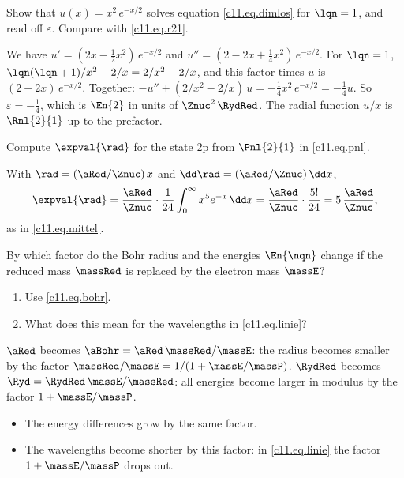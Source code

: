 \begin{exercise}\label{c11.exc.zweip}
  Show that $u(x) = x^2\,e^{-x/2}$ solves equation \eqref{c11.eq.dimlos} for $\lqn = 1$,
  and read off $\varepsilon$. Compare with \eqref{c11.eq.r21}.
\end{exercise}
\begin{solution}
  We have $u' = (2x - \tfrac12 x^2)\,e^{-x/2}$ and
  $u'' = (2 - 2x + \tfrac14 x^2)\,e^{-x/2}$. For $\lqn = 1$,
  $\lqn(\lqn + 1)/x^2 - 2/x = 2/x^2 - 2/x$, and this factor times $u$ is
  $(2 - 2x)\,e^{-x/2}$. Together:
  $-u'' + (2/x^2 - 2/x)\,u = -\tfrac14 x^2\,e^{-x/2} = -\tfrac14 u$. So
  $\varepsilon = -\tfrac14$, which is $\En{2}$ in units of $\Znuc^2\,\RydRed$. The radial
  function $u/x$ is $\Rnl{2}{1}$ up to the prefactor.
\end{solution}

\begin{exercise}\label{c11.exc.mittel}
  Compute $\expval{\rad}$ for the state 2p from $\Pnl{2}{1}$ in \eqref{c11.eq.pnl}.
\end{exercise}
\begin{solution}
  With $\rad = (\aRed/\Znuc)\,x$ and $\dd\rad = (\aRed/\Znuc)\,\dd x$,
  \begin{equation*}
    \expval{\rad} = \frac{\aRed}{\Znuc} \cdot \frac{1}{24}\int_0^\infty x^5 e^{-x}\,\dd x
    = \frac{\aRed}{\Znuc} \cdot \frac{5!}{24} = 5\,\frac{\aRed}{\Znuc},
  \end{equation*}
  as in \eqref{c11.eq.mittel}.
\end{solution}

\begin{exercise}\label{c11.exc.unendlich}
  By which factor do the Bohr radius and the energies $\En{\nqn}$ change if the reduced
  mass $\massRed$ is replaced by the electron mass $\massE$?
  \begin{enumerate}
    \item Use \eqref{c11.eq.bohr}.
    \item What does this mean for the wavelengths in \eqref{c11.eq.linie}?
  \end{enumerate}
\end{exercise}
\begin{solution}
  $\aRed$ becomes $\aBohr = \aRed\,\massRed/\massE$: the radius becomes smaller by the
  factor $\massRed/\massE = 1/(1 + \massE/\massP)$. $\RydRed$ becomes
  $\Ryd = \RydRed\,\massE/\massRed$: all energies become larger in modulus by the factor
  $1 + \massE/\massP$.
  \begin{itemize}
    \item The energy differences grow by the same factor.
    \item The wavelengths become shorter by this factor: in \eqref{c11.eq.linie} the
      factor $1 + \massE/\massP$ drops out.
  \end{itemize}
\end{solution}


